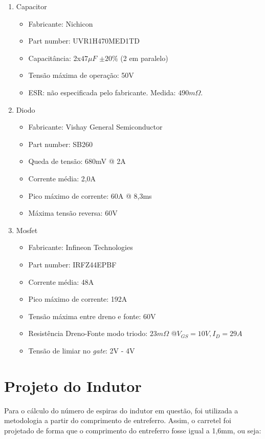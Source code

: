 \documentclass[a4paper]{article}
\begin{document}
{\begin{enumerate}

\item Capacitor
\begin{itemize}
\item Fabricante: Nichicon
\item Part number: UVR1H470MED1TD
\item Capacitância: 2x$47 \mu F$ $\pm 20\%$ (2 em paralelo)
\item Tensão máxima de operação: 50V
\item ESR: não especificada pelo fabricante. Medida: $490 m\Omega$.
\end{itemize}

\item Diodo
\begin{itemize}
\item Fabricante: Vishay General Semiconductor
\item Part number: SB260
\item Queda de tensão: 680mV @ 2A
\item Corrente média: 2,0A
\item Pico máximo de corrente: 60A @ 8,3ms
\item Máxima tensão reversa: 60V
\end{itemize}

\item Mosfet
\begin{itemize}
\item Fabricante: Infineon Technologies	
\item Part number: IRFZ44EPBF
\item Corrente média: 48A
\item Pico máximo de corrente: 192A
\item Tensão máxima entre dreno e fonte: 60V
\item Resistência Dreno-Fonte modo triodo: $23m\Omega$ @$V_{GS} = 10V, I_D = 29A$
\item Tensão de limiar no \emph{gate}: 2V - 4V
\end{itemize}

\end{enumerate}

\clearpage

\section{Projeto do Indutor}

Para o cálculo do número de espiras do indutor em questão, foi utilizada a metodologia a partir do comprimento de entreferro. Assim, o carretel foi projetado de forma que o comprimento do entreferro fosse igual a 1,6mm, ou seja:

}
\end{document}

